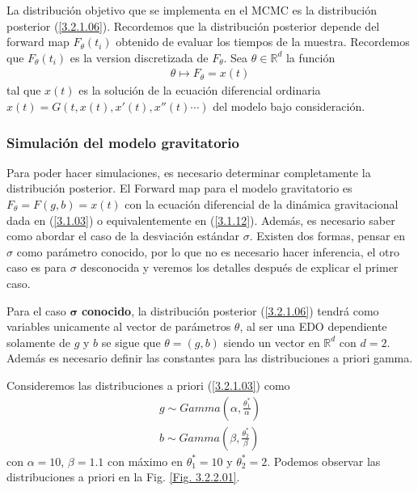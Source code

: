 La distribución objetivo que se implementa en el MCMC es la distribución posterior (\ref{3.2.1.06}). Recordemos que la distribución posterior depende del forward map $F_{\theta}(t_i)$ obtenido de evaluar los tiempos de la muestra. Recordemos que $F_{\theta}(t_i)$ es la version discretizada de $F_{\theta}$. Sea $\theta \in \mathbb{R}^d$ la función
\begin{align}
    \theta  \mapsto F_{\theta} = x(t) 
\end{align}
tal que $x(t)$ es la solución de la ecuación diferencial ordinaria $x(t) = G(t,x(t),x'(t),x''(t)\cdots)$ del modelo bajo consideración.

\subsubsection{Simulación del modelo gravitatorio}

Para poder hacer simulaciones, es necesario determinar completamente la distribución posterior. El Forward map para el modelo gravitatorio es $F_{\theta} = F(g,b) = x(t)$ con la ecuación diferencial de la dinámica gravitacional dada en (\ref{3.1.03}) o equivalentemente en (\ref{3.1.12}). Además, es necesario saber como abordar el caso de la desviación estándar $\sigma$. Existen dos formas, pensar en $\sigma$ como parámetro conocido, por lo que no es necesario hacer inferencia, el otro caso es para $\sigma$ desconocida y veremos los detalles después de explicar el primer caso.

Para el caso $\mathbf{\sigma}$ \textbf{conocido}, la distribución posterior (\ref{3.2.1.06}) tendrá como variables unicamente al vector de parámetros $\theta$, al ser una EDO dependiente solamente de $g$ y $b$ se sigue que $\theta = (g,b)$ siendo un vector en $\mathbb{R}^{d}$ con $d = 2$. Además es necesario definir las constantes para las distribuciones a priori gamma.

Consideremos las distribuciones a priori (\ref{3.2.1.03}) como
\begin{align}
    g \sim Gamma \left(\alpha, \frac{\theta_1^{*}}{\alpha}\right) \\
    b \sim Gamma \left(\beta, \frac{\theta_2^{*}}{\beta}\right) 
\end{align}
con $\alpha = 10$, $\beta = 1.1$ con máximo en $\theta_1^{*} = 10$ y $\theta_2^{*} = 2$. Podemos observar las distribuciones a priori en la Fig. \ref{Fig. 3.2.2.01}.


